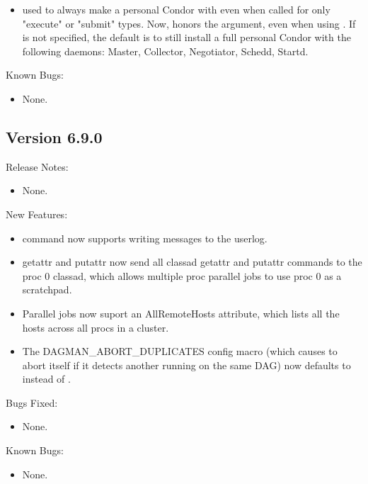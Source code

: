 \begin{itemize}

\item {} used to always make a personal Condor with
 even when  called for only "execute" or
"submit" types.  Now,  honors the 
argument, even when using .
If  is not specified, the default is to still install a
full personal Condor with the following daemons: Master, Collector,
Negotiator, Schedd, Startd. 

\end{itemize}

\noindent Known Bugs:

\begin{itemize}

\item None.

\end{itemize}

\subsection*{\label{sec:New-6-9-0}Version 6.9.0}

\noindent Release Notes:

\begin{itemize}

\item None.

\end{itemize}


\noindent New Features:

\begin{itemize}

\item {} command now supports writing messages to the userlog.

\item {} getattr and putattr now send all classad getattr and putattr
commands to the proc 0 classad, which allows multiple proc parallel jobs to
use proc 0 as a scratchpad.

\item Parallel jobs now suport an AllRemoteHosts attribute, which lists all the
hosts across all procs in a cluster.

\item The DAGMAN\_ABORT\_DUPLICATES config macro (which causes
 to abort itself if it detects another 
running on the same DAG) now defaults to  instead of
.

\end{itemize}

\noindent Bugs Fixed:

\begin{itemize}

\item None.

\end{itemize}

\noindent Known Bugs:

\begin{itemize}

\item None.

\end{itemize}

